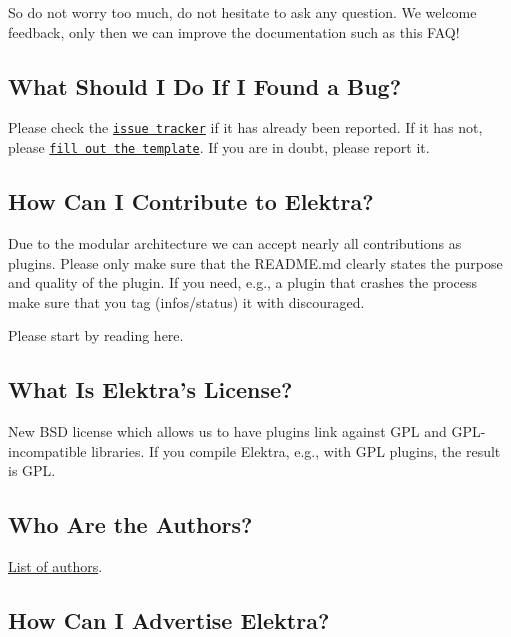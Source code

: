 So do not worry too much, do not hesitate to ask any question. We welcome feedback, only then we can improve the documentation such as this F\+A\+Q!

\subsection*{What Should I Do If I Found a Bug?}

Please check the \href{https://git.libelektra.org/issues}{\tt issue tracker} if it has already been reported. If it has not, please \href{https://git.libelektra.org/issues/new}{\tt fill out the template}. If you are in doubt, please report it.

\subsection*{How Can I Contribute to Elektra?}

Due to the modular architecture we can accept nearly all contributions as plugins. Please only make sure that the R\+E\+A\+D\+M\+E.\+md clearly states the purpose and quality of the plugin. If you need, e.\+g., a plugin that crashes the process make sure that you tag ({\ttfamily infos/status}) it with {\ttfamily discouraged}.

Please start by reading here.

\subsection*{What Is Elektra’s License?}

New B\+SD license which allows us to have plugins link against G\+PL and G\+P\+L-\/incompatible libraries. If you compile Elektra, e.\+g., with G\+PL plugins, the result is G\+PL.

\subsection*{Who Are the Authors?}

\hyperlink{doc_AUTHORS_md}{List of authors}.

\subsection*{How Can I Advertise Elektra?}


